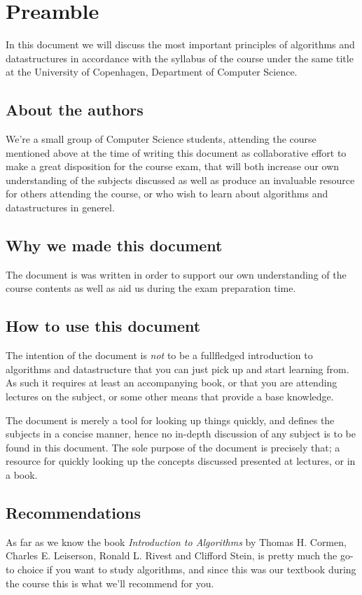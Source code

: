 
\newpage
\pagestyle{fancy}

\chapter{Preamble}
In this document we will discuss the most important principles of algorithms
and datastructures in accordance with the syllabus of the course under the
same title at the University of Copenhagen, Department of Computer Science.

\section*{About the authors}
We're a small group of Computer Science students, attending the course
mentioned above at the time of writing this document as collaborative effort
to make a great disposition for the course exam, that will both increase our
own understanding of the subjects discussed as well as produce an invaluable
resource for others attending the course, or who wish to learn about
algorithms and datastructures in generel.

\section*{Why we made this document}
The document is was written in order to support our own understanding of the
course contents as well as aid us during the exam preparation time.

\newpage
\section*{How to use this document}
The intention of the document is \textit{not} to be a fullfledged introduction
to algorithms and datastructure that you can just pick up and start learning
from. As such it requires at least an accompanying book, or that you are
attending lectures on the subject, or some other means that provide a base
knowledge.

The document is merely a tool for looking up things quickly, and defines the
subjects in a concise manner, hence no in-depth discussion of any subject is
to be found in this document. The sole purpose of the document is precisely
that; a resource for quickly looking up the concepts discussed presented at
lectures, or in a book.

\section*{Recommendations}
As far as we know the book \textit{Introduction to Algorithms} by Thomas H.
Cormen, Charles E. Leiserson, Ronald L. Rivest and Clifford Stein, is pretty
much the go-to choice if you want to study algorithms, and since this was our
textbook during the course this is what we'll recommend for you.

